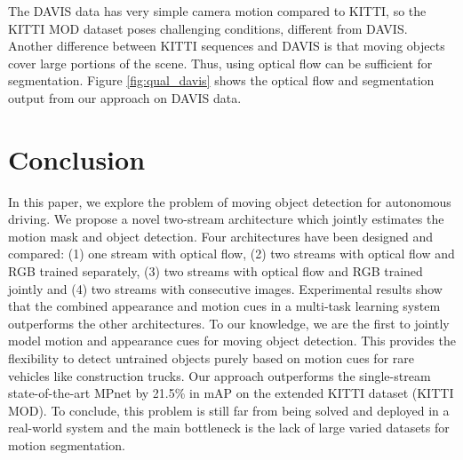 \documentclass[letterpaper, 10 pt, conference]{ieeeconf}  %
\begin{document}
The DAVIS data has very simple camera motion compared to KITTI, so the KITTI MOD dataset poses challenging conditions, different from DAVIS. Another difference between KITTI sequences and DAVIS is that moving objects cover large portions of the scene. Thus, using optical flow can be sufficient for segmentation. Figure \ref{fig:qual_davis} shows the optical flow and segmentation output from our approach on DAVIS data. 



\section{Conclusion}
\label{sec:conc}
In this paper, we explore the problem of moving object detection for autonomous driving. We propose a novel two-stream architecture which jointly estimates the motion mask and object detection. Four architectures have been designed and compared: (1) one stream with optical flow, (2) two streams with optical flow and RGB trained separately, (3)  two streams with optical flow and RGB trained jointly and  (4) two streams with consecutive images. Experimental results show that the combined appearance and motion cues in a multi-task learning system outperforms the other architectures. To our knowledge, we are the first to jointly model motion and appearance cues for moving object detection. This provides the flexibility to detect untrained objects purely based on motion cues for rare vehicles like construction trucks. Our approach outperforms the single-stream state-of-the-art MPnet by 21.5\% in mAP on the extended KITTI dataset (KITTI MOD). To conclude, this problem is still far from being solved and deployed in a real-world system and the main bottleneck is the lack of large varied datasets for motion segmentation.


{\small


}
\end{document}

